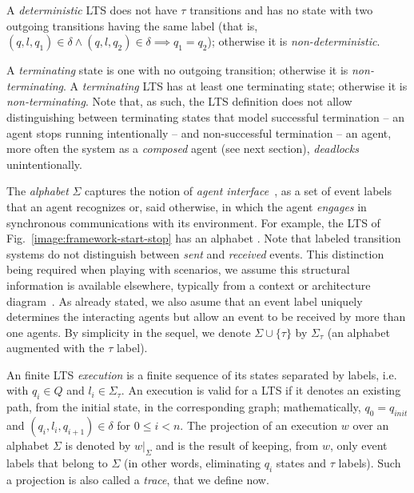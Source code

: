A \emph{deterministic} LTS does not have $\tau$ transitions and has no state with two outgoing transitions having the same label (that is, $(q,l,q_1) \in \delta \wedge (q,l,q_2) \in \delta \implies q_1 = q_2$); otherwise it is \emph{non-deterministic}.

A \emph{terminating} state is one with no outgoing transition; otherwise it is \emph{non-terminating}. A \emph{terminating} LTS has at least one terminating state; otherwise it is \emph{non-terminating}. Note that, as such, the LTS definition does not allow distinguishing between terminating states that model successful termination -- an agent stops running intentionally -- and non-successful termination -- an agent, more often the system as a \emph{composed} agent (see next section), \emph{deadlocks} unintentionally.

The \emph{alphabet} $\Sigma$ captures the notion of \emph{agent interface}~\cite{Feather:1987}, as a set of event labels that an agent recognizes or, said otherwise, in which the agent \emph{engages} in synchronous communications with its environment. For example, the LTS of Fig.~\ref{image:framework-start-stop} has an alphabet . Note that labeled transition systems do not distinguish between \emph{sent} and \emph{received} events. This distinction being required when playing with scenarios, we assume this structural information is available elsewhere, typically from a context or architecture diagram~\cite{Ward:1985, Magee:1995}. As already stated, we also asume that an event label uniquely determines the interacting agents but allow an event to be received by more than one agents. By simplicity in the sequel, we denote $\Sigma\cup\{\tau\}$ by $\Sigma_{\tau}$ (an alphabet augmented with the $\tau$ label).

An finite LTS \emph{execution} is a finite sequence of its states separated by labels, i.e.  with $q_i \in Q$ and $l_i \in \Sigma_{\tau}$. An execution is valid for a LTS if it denotes an existing path, from the initial state, in the corresponding graph; mathematically, $q_0 = q_{init}$ and $(q_i,l_i,q_{i+1}) \in \delta$ for $0 \leq i < n$. The projection of an execution $w$ over an alphabet $\Sigma$ is denoted by $w|_{\Sigma}$ and is the result of keeping, from $w$, only event labels that belong to $\Sigma$ (in other words, eliminating $q_i$ states and $\tau$ labels). Such a projection is also called a \emph{trace}, that we define now.

